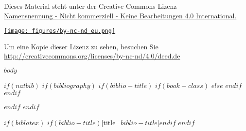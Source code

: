 \documentclass[12pt,a4paper, twoside=false]{scrartcl}
\begin{document}
\begin{titlepage}
    \begin{center}
       Dieses Material steht unter der Creative-Commons-Lizenz\\
       \href{http://creativecommons.org/licenses/by-nc-nd/4.0/deed.de}{Namensnennung - Nicht kommerziell - Keine Bearbeitungen 4.0 International.} \\
    \end{center}
    \begin{center}
        \href{http://creativecommons.org/licenses/by-nc-nd/4.0/deed.de}{\texttt{[image: figures/by-nc-nd\_eu.png]}}
    \end{center}
	\begin{center}
       Um eine Kopie dieser Lizenz zu sehen, besuchen Sie\\
       \href{http://creativecommons.org/licenses/by-nc-nd/4.0/deed.de}{http://creativecommons.org/licenses/by-nc-nd/4.0/deed.de}\\
	\end{center}

\end{titlepage}




$body$

$if(natbib)$
$if(bibliography)$
$if(biblio-title)$
$if(book-class)$
\renewcommand\bibname{$biblio-title$}
$else$
\renewcommand\refname{$biblio-title$}
$endif$
$endif$

$endif$
$endif$

$if(biblatex)$
\printbibliography$if(biblio-title)$[title=$biblio-title$]$endif$
$endif$
\end{document}
